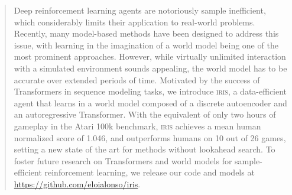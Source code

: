 \begin{abstract}
Deep reinforcement learning agents are notoriously sample inefficient, which considerably limits their application to real-world problems. Recently, many model-based methods have been designed to address this issue, with learning in the imagination of a world model being one of the most prominent approaches. However, while virtually unlimited interaction with a simulated environment sounds appealing, the world model has to be accurate over extended periods of time. Motivated by the success of Transformers in sequence modeling tasks, we introduce \textsc{iris}, a data-efficient agent that learns in a world model composed of a discrete autoencoder and an autoregressive Transformer. With the equivalent of only two hours of gameplay in the Atari 100k benchmark, \textsc{iris} achieves a mean human normalized score of 1.046, and outperforms humans on 10 out of 26 games, setting a new state of the art for methods without lookahead search. To foster future research on Transformers and world models for sample-efficient reinforcement learning, we release our code and models at \small \url{https://github.com/eloialonso/iris}.
\end{abstract}